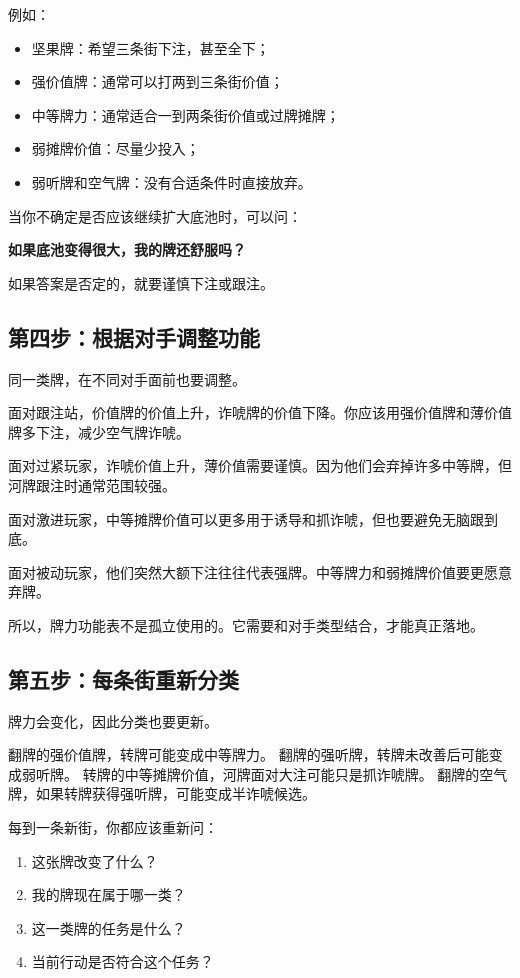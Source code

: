 例如：

\begin{itemize}
\item 坚果牌：希望三条街下注，甚至全下；
\item 强价值牌：通常可以打两到三条街价值；
\item 中等牌力：通常适合一到两条街价值或过牌摊牌；
\item 弱摊牌价值：尽量少投入；
\item 弱听牌和空气牌：没有合适条件时直接放弃。
\end{itemize}

当你不确定是否应该继续扩大底池时，可以问：

\begin{center}
\textbf{如果底池变得很大，我的牌还舒服吗？}
\end{center}

如果答案是否定的，就要谨慎下注或跟注。

\subsection{第四步：根据对手调整功能}

同一类牌，在不同对手面前也要调整。

面对跟注站，价值牌的价值上升，诈唬牌的价值下降。你应该用强价值牌和薄价值牌多下注，减少空气牌诈唬。

面对过紧玩家，诈唬价值上升，薄价值需要谨慎。因为他们会弃掉许多中等牌，但河牌跟注时通常范围较强。

面对激进玩家，中等摊牌价值可以更多用于诱导和抓诈唬，但也要避免无脑跟到底。

面对被动玩家，他们突然大额下注往往代表强牌。中等牌力和弱摊牌价值要更愿意弃牌。

所以，牌力功能表不是孤立使用的。它需要和对手类型结合，才能真正落地。

\subsection{第五步：每条街重新分类}

牌力会变化，因此分类也要更新。

翻牌的强价值牌，转牌可能变成中等牌力。
翻牌的强听牌，转牌未改善后可能变成弱听牌。
转牌的中等摊牌价值，河牌面对大注可能只是抓诈唬牌。
翻牌的空气牌，如果转牌获得强听牌，可能变成半诈唬候选。

每到一条新街，你都应该重新问：

\begin{enumerate}
\item 这张牌改变了什么？
\item 我的牌现在属于哪一类？
\item 这一类牌的任务是什么？
\item 当前行动是否符合这个任务？
\end{enumerate}

